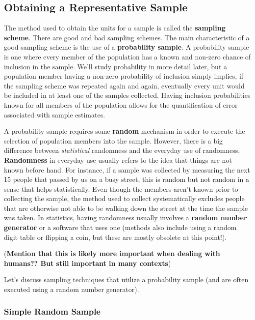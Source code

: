 \documentclass[
]{book}
\theoremstyle{definition}
\theoremstyle{definition}
\theoremstyle{definition}
\theoremstyle{remark}
\begin{document}
\hypertarget{obtaining-a-representative-sample}{%
\subsection{Obtaining a Representative Sample}\label{obtaining-a-representative-sample}}

The method used to obtain the units for a sample is called the \textbf{sampling scheme}. There are good and bad sampling schemes. The main characteristic of a good sampling scheme is the use of a \textbf{probability sample}. A probability sample is one where every member of the population has a known and non-zero chance of inclusion in the sample. We'll study probability in more detail later, but a population member having a non-zero probability of inclusion simply implies, if the sampling scheme was repeated again and again, eventually every unit would be included in at least one of the samples collected. Having inclusion probabilities known for all members of the population allows for the quantification of error associated with sample estimates.

A probability sample requires some \textbf{random} mechanism in order to execute the selection of population members into the sample. However, there is a big difference between \emph{statistical} randomness and the everyday use of randomness. \textbf{Randomness} in everyday use usually refers to the idea that things are not known before hand. For instance, if a sample was collected by measuring the next 15 people that passed by us on a busy street, this is random but not random in a sense that helps statistically. Even though the members aren't known prior to collecting the sample, the method used to collect systematically excludes people that are otherwise not able to be walking down the street at the time the sample was taken. In statistics, having randomness usually involves a \textbf{random number generator} or a software that uses one (methods also include using a random digit table or flipping a coin, but these are mostly obsolete at this point!).

(\textbf{Mention that this is likely more important when dealing with humans?? But still important in many contexts})

Let's discuss sampling techniques that utilize a probability sample (and are often executed using a random number generator).

\hypertarget{simple-random-sample}{%
\subsubsection{Simple Random Sample}\label{simple-random-sample}}
\end{document}

